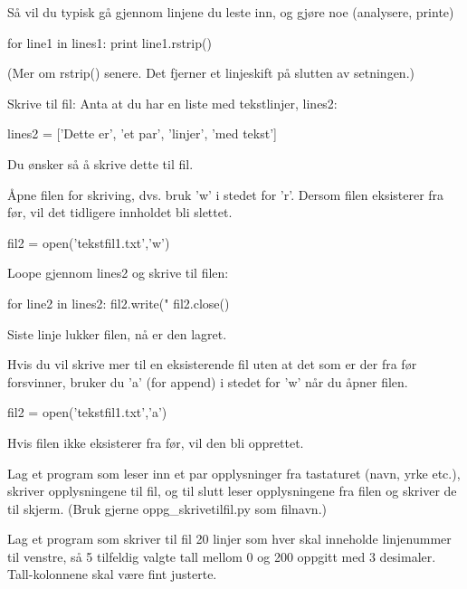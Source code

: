 Så vil du typisk gå gjennom linjene du leste inn, og gjøre noe (analysere, printe)
\begin{usncodebox}
for line1 in lines1:
    print line1.rstrip()
\end{usncodebox}

(Mer om rstrip() senere. Det fjerner et linjeskift på slutten av setningen.)

Skrive til fil: 
Anta at du har en liste med tekstlinjer, lines2:

\begin{usncodebox}
lines2 = ['Dette er', 'et par', 'linjer', 'med tekst']
\end{usncodebox}

Du ønsker så å skrive dette til fil.

Åpne filen for skriving, dvs. bruk 'w' i stedet for 'r'. Dersom filen eksisterer fra før, vil det tidligere innholdet bli slettet.

\begin{usncodebox}
fil2 = open('tekstfil1.txt','w')    
\end{usncodebox}

Loope gjennom lines2 og skrive til filen:
\begin{usncodebox}
for line2 in lines2:
    fil2.write("%
fil2.close()
\end{usncodebox}

Siste linje lukker filen, nå er den lagret. 

Hvis du vil skrive mer til en eksisterende fil uten at det som er der fra før forsvinner, bruker du 'a' (for append) i stedet for 'w' når du åpner filen.

\begin{usncodebox}
fil2 = open('tekstfil1.txt','a')
\end{usncodebox}

Hvis filen ikke eksisterer fra før, vil den bli opprettet. 
 
\begin{exercise}
Lag et program som leser inn et par opplysninger fra tastaturet (navn, yrke etc.), skriver opplysningene til fil, og til slutt leser 
opplysningene fra filen og skriver de til skjerm. (Bruk gjerne oppg\_{}skrivetilfil.py som filnavn.)
\end{exercise}

\begin{exercise}
Lag et program som skriver til fil 20 linjer som hver skal inneholde linjenummer til venstre, så 5 tilfeldig valgte tall mellom 0 og 200 oppgitt med 3 desimaler. Tall-kolonnene skal være fint justerte.
\end{exercise}

